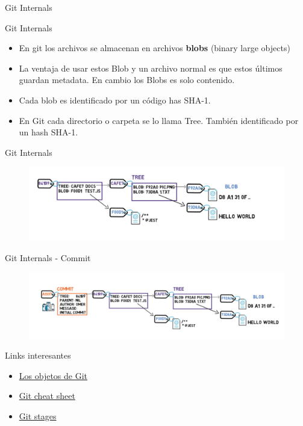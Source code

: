 \documentclass{beamer}
\begin{document}
\begin{frame}
   \Huge Git Internals
\end{frame}

\begin{frame}{Git Internals}
	\begin{itemize}
		\item En git los archivos se almacenan en archivos \textbf{blobs} (binary large objects)
		\item La ventaja de usar estos Blob y un archivo normal es que estos últimos guardan metadata. En cambio los Blobs es solo contenido.
		\item Cada blob es identificado por un código has SHA-1. 
		\item En Git cada directorio o carpeta se lo llama Tree. También identificado por un hash SHA-1.
	\end{itemize}
\end{frame}

\begin{frame}{Git Internals}
	\begin{figure}
		\centering
		\includegraphics[width=1\linewidth]{img/tree-blobs}
		\label{fig:tree-blobs}
	\end{figure}
\end{frame}

\begin{frame}{Git Internals - Commit}
\begin{figure}
	\centering
	\includegraphics[width=1\linewidth]{img/tree-blobs1}
	\label{fig:tree-blobs1}
\end{figure}
\end{frame}

\begin{frame}[plain]{Links interesantes}
	\begin{itemize}
		\item \href{https://git-scm.com/book/es/v2/Los-entresijos-internos-de-Git-Los-objetos-Git}{Los objetos de Git}
		\item \href{https://www.bitdegree.org/learn/git-cheat-sheet}{Git cheat sheet}
		\item \href{https://almasumfahim.com/git-stages/}{Git stages}
	\end{itemize}
\end{frame}
\end{document}
